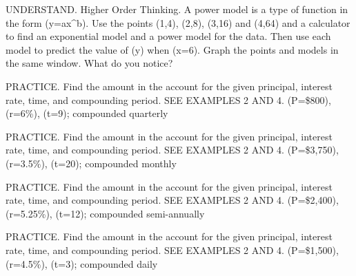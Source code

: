 \documentclass{article}
\newenvironment{practice}[2]{}{}        %
\newcommand{\answer}[1]{}               %
\newcommand{\placeholder}[2]{}          %
\newcommand{\te}[1]{}                   %
\begin{document}
\begin{practice}{15}{3}
UNDERSTAND. Higher Order Thinking. A power model is a type of function in the form (y=a\cdot x^b). Use the points (1,4), (2,8), (3,16) and (4,64) and a calculator to find an exponential model and a power model for the data. Then use each model to predict the value of (y) when (x=6). Graph the points and models in the same window. What do you notice?
\answer{exponential model: (y=1.414(2.462)^x); power model: (y=3.125(x^{1.837})); exponential model: 314.9; power model: 120.1; The exponential model is a better fit because its (r^2) value is higher. The exponential functions increases at a faster rate than the power function.}
\placeholder{graph}{Printed answer graph: x-axis x labeled 2,4,6, origin O; y-axis y labeled 20,40,60. Grid spacing 1 horizontally,10 vertically; window x=-2 to7, y=-20 to70. Both axes have positive arrowheads, y also negative. Red exponential curve near y=0 on left, crossing y-axis near1.4 and exiting top near x4.3; blue curve crosses the y-axis near3.1 and exits top nearx5; both curves have left and upper arrowheads. No individual data points or legend printed.}
\te{Printed blue curve extends to negative x; likely a schematic drawing, as the stated noninteger power model has no real values for negative x.}
\end{practice}
\begin{practice}{16}{1}
PRACTICE. Find the amount in the account for the given principal, interest rate, time, and compounding period. SEE EXAMPLES 2 AND 4.
(P=\$800), (r=6\%), (t=9); compounded quarterly
\answer{\$1,367.31}
\end{practice}
\begin{practice}{17}{1}
PRACTICE. Find the amount in the account for the given principal, interest rate, time, and compounding period. SEE EXAMPLES 2 AND 4.
(P=\$3,750), (r=3.5\%), (t=20); compounded monthly
\answer{\$7,543.88}
\end{practice}
\begin{practice}{18}{1}
PRACTICE. Find the amount in the account for the given principal, interest rate, time, and compounding period. SEE EXAMPLES 2 AND 4.
(P=\$2,400), (r=5.25\%), (t=12); compounded semi-annually
\answer{\$4,469.79}
\end{practice}
\begin{practice}{19}{1}
PRACTICE. Find the amount in the account for the given principal, interest rate, time, and compounding period. SEE EXAMPLES 2 AND 4.
(P=\$1,500), (r=4.5\%), (t=3); compounded daily
\answer{\$1,716.79}
\end{practice}
\end{document}
